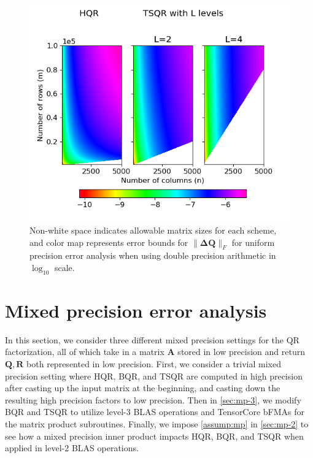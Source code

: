 \documentclass[review,onefignum,onetabnum]{siamart190516}
\newcommand{\bb}[1]{\mathbf{#1}}
\begin{document}
\begin{figure}
	\centering
	\includegraphics[width=.45\textwidth]{../figures/paramspace3.png}
	\caption{\label{fig:paramspace} Non-white space indicates allowable matrix sizes for each scheme, and color map represents error bounds for $\|\bb{\Delta Q}\|_F$ for uniform precision error analysis when using double precision arithmetic in $\log_{10}$ scale.}
	\vspace{-10pt}	
\end{figure}
\section{Mixed precision error analysis}\label{sec:mpanalysis}
%
In this section, we consider three different mixed precision settings for the QR factorization, all of which take in a matrix $\bb{A}$ stored in low precision and return $\bb{Q},\bb{R}$ both represented in low precision. 
First, we consider a trivial mixed precision setting where HQR, BQR, and TSQR are computed in high precision after casting up the input matrix at the beginning, and casting down the resulting high precision factors to low precision. 
Then in \cref{sec:mp-3}, we modify BQR and TSQR to utilize level-3 BLAS operations and TensorCore bFMAs for the matrix product subroutines. 
Finally, we impose \cref{assump:mp} in \cref{sec:mp-2} to see how a mixed precision inner product impacts HQR, BQR, and TSQR when applied in level-2 BLAS operations.
\end{document}
